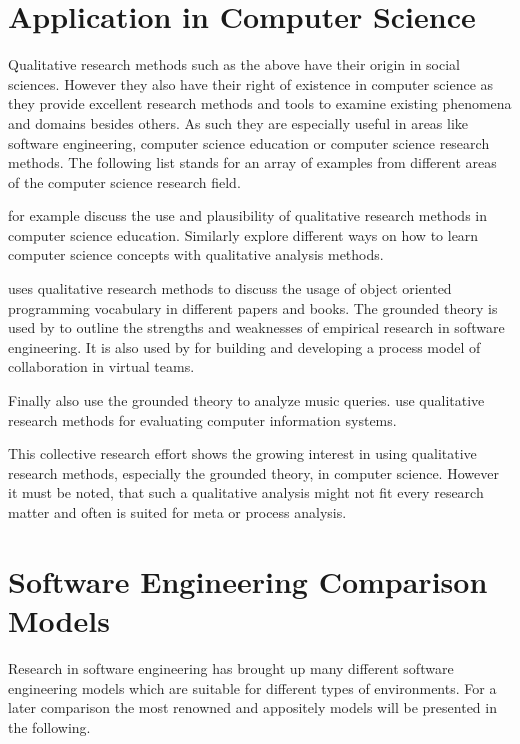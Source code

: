 
\section{Application in Computer Science} %

Qualitative research methods such as the above have their origin in social
sciences. However they also have their right of existence in computer science
as they provide excellent research methods and tools to examine existing
phenomena and domains besides others. As such they are especially useful in
areas like software engineering, computer science education or computer science
research methods. The following list stands for an array of examples from
different areas of the computer science research field.

\textcite{Hazzan2006} for example discuss the use and plausibility of
qualitative research methods in computer science education. Similarly
\textcite{Meerbaum-Salant2010} explore different ways on how to learn computer
science concepts with qualitative analysis methods.

\textcite{Armstrong2006} uses qualitative research methods to discuss the usage
of object oriented programming vocabulary in different papers and books. The
grounded theory is used by \textcite{Perry2000} to outline the strengths and
weaknesses of empirical research in software engineering. It is also used by
\textcite{Sarker2001} for building and developing a process model of
collaboration in virtual teams.

Finally also \textcite{Bainbridge2003} use the grounded theory to analyze
music queries. \textcite{Kaplan1994} use qualitative research methods for
evaluating computer information systems.

This collective research effort shows the growing interest in using qualitative
research methods, especially the grounded theory, in computer science. However
it must be noted, that such a qualitative analysis might not fit every research
matter and often is suited for meta or process analysis.


\section{Software Engineering Comparison Models} %

Research in software engineering has brought up many different software
engineering models which are suitable for different types of environments. For
a later comparison the most renowned and appositely models will be presented in
the following.

